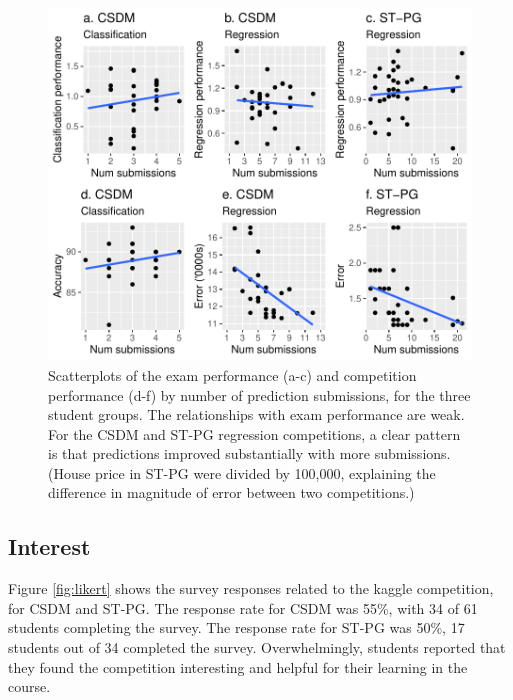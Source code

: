 \documentclass[12pt]{article}
\begin{document}
\begin{figure}
\centering
\includegraphics{paper-kaggle_files/figure-latex/numsubmition-1.pdf}
\caption{\label{fig:numsubmition} Scatterplots of the exam performance
(a-c) and competition performance (d-f) by number of prediction
submissions, for the three student groups. The relationships with exam
performance are weak. For the CSDM and ST-PG regression competitions, a
clear pattern is that predictions improved substantially with more
submissions. (House price in ST-PG were divided by 100,000, explaining
the difference in magnitude of error between two competitions.)}
\end{figure}

\subsection{Interest}\label{interest-1}

Figure \ref{fig:likert} shows the survey responses related to the kaggle
competition, for CSDM and ST-PG. The response rate for CSDM was 55\%,
with 34 of 61 students completing the survey. The response rate for
ST-PG was 50\%, 17 students out of 34 completed the survey.
Overwhelmingly, students reported that they found the competition
interesting and helpful for their learning in the course.
\end{document}
